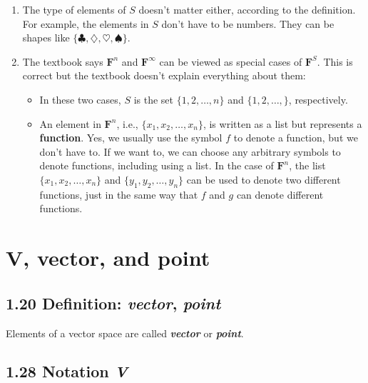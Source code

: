 \documentclass[12pt, letterpaper, oneside]{book}
\begin{document}
\begin{enumerate}
  \item The type of elements of $S$ doesn't matter either, according to the
    definition. For example, the elements in $S$ don't have to be numbers. They
    can be shapes like $\{ \clubsuit, \diamondsuit, \heartsuit, \spadesuit \}$.
  \item The textbook says $\mathbf{F}^n$ and $\mathbf{F}^{\infty}$ can be
    viewed as special cases of $\mathbf{F}^S$. This is correct but the textbook
    doesn't explain everything about them:
    \begin{itemize}
      \item In these two cases, $S$ is the set $\{ 1, 2, \ldots, n \}$ and
      $\{ 1, 2, \ldots, \}$, respectively.
      \item An element in $\mathbf{F}^n$, i.e., $\{ x_1, x_2, \ldots, x_n \}$,
        is written as a list but represents a \textbf{function}. Yes, we
        usually use the symbol $f$ to denote a function, but we don't have to.
        If we want to, we can choose any arbitrary symbols to denote functions,
        including using a list. In the case of $\mathbf{F}^n$, the list
        $\{ x_1, x_2, \ldots, x_n \}$ and $\{ y_1, y_2, \ldots, y_n \}$ can be
        used to denote two different functions, just in the same way that $f$
        and $g$ can denote different functions.
    \end{itemize}
\end{enumerate}

\section{\textbf{V}, \textbf{vector}, and \textbf{point}}

\subsection{1.20 Definition: \textbf{\textit{vector}}, \textbf{\textit{point}}}

Elements of a vector space are called \textbf{\textit{vector}} or
\textbf{\textit{point}}.

\subsection{1.28 Notation \textbf{\textit{V}}}
\end{document}
